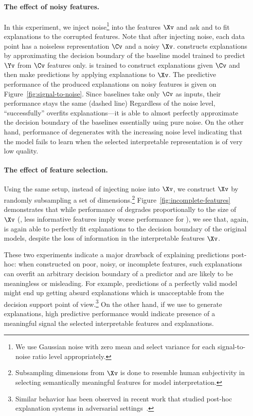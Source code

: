 \documentclass[twoside,11pt]{article}
\begin{document}
\paragraph{The effect of noisy features.}
In this experiment, we inject noise\footnote{We use Gaussian noise with zero mean and select variance for each signal-to-noise ratio level appropriately.} into the features $\Xv$ and ask {\LIME} and {\CEN} to fit explanations to the corrupted features.
Note that after injecting noise, each data point has a noiseless representation $\Cv$ and a noisy $\Xv$.
{\LIME} constructs explanations by approximating the decision boundary of the baseline model trained to predict $\Yv$ from $\Cv$ features only.
{\CEN} is trained to construct explanations given $\Cv$ and then make predictions by applying explanations to $\Xv$.
The predictive performance of the produced explanations on noisy features is given on Figure~\ref{fig:signal-to-noise}.
Since baselines take only $\Cv$ as inputs, their performance stays the same (dashed line)
Regardless of the noise level, {\LIME} ``successfully'' overfits explanations---it is able to almost perfectly approximate the decision boundary of the baselines essentially using pure noise.
On the other hand, performance of {\CEN} degenerates with the increasing noise level indicating that the model fails to learn when the selected interpretable representation is of very low quality.

\paragraph{The effect of feature selection.}
Using the same setup, instead of injecting noise into $\Xv$, we construct $\Xv$ by randomly subsampling a set of dimensions.\footnote{Subsampling dimensions from $\Xv$ is done to resemble human subjectivity in selecting semantically meaningful features for model interpretation.}
Figure~\ref{fig:incomplete-features} demonstrates that while performance of {\CENs} degrades proportionally to the size of $\Xv$ (\ie, less informative features imply worse performance for \CEN), we see that, again, {\LIME} is again able to perfectly fit explanations to the decision boundary of the original models, despite the loss of information in the interpretable features $\Xv$.

These two experiments indicate a major drawback of explaining predictions post-hoc: when constructed on poor, noisy, or incomplete features, such explanations can overfit an arbitrary decision boundary of a predictor and are likely to be meaningless or misleading.
For example, predictions of a perfectly valid model might end up getting absurd explanations which is unacceptable from the decision support point of view.\footnote{Similar behavior has been observed in recent work that studied post-hoc explanation systems in adversarial settings~\citep{dombrowski2019explanations, lakkaraju2019fool}.}
On the other hand, if we use {\CEN} to generate explanations, high predictive performance would indicate presence of a meaningful signal the selected interpretable features and explanations.
\end{document}

